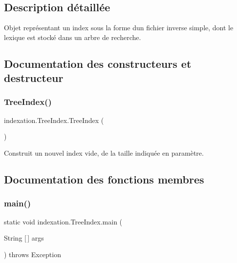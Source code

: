 \subsection{Description détaillée}
Objet représentant un index sous la forme d\textquotesingle{}un fichier inverse simple, dont le lexique est stocké dans un arbre de recherche. 

\subsection{Documentation des constructeurs et destructeur}
\mbox{\label{classindexation_1_1TreeIndex_af205f794f0b231d2709fda820e6108d5}} 
\subsubsection{\texorpdfstring{Tree\+Index()}{TreeIndex()}}
{\footnotesize\ttfamily indexation.\+Tree\+Index.\+Tree\+Index (\begin{DoxyParamCaption}{ }\end{DoxyParamCaption})}

Construit un nouvel index vide, de la taille indiquée en paramètre. 

\subsection{Documentation des fonctions membres}
\mbox{\label{classindexation_1_1TreeIndex_a4f55b3dbea75a32916f507012e3f2b29}} 
\subsubsection{\texorpdfstring{main()}{main()}}
{\footnotesize\ttfamily static void indexation.\+Tree\+Index.\+main (\begin{DoxyParamCaption}\item[{String \mbox{[}$\,$\mbox{]}}]{args }\end{DoxyParamCaption}) throws Exception\hspace{0.3cm}{\ttfamily [static]}}

